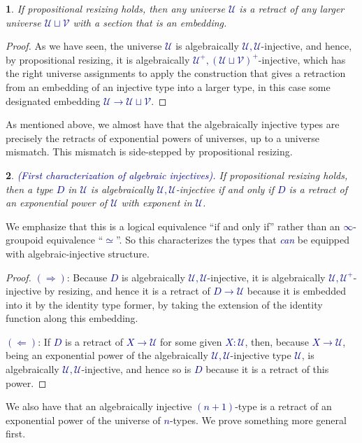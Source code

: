 \documentclass[10pt]{article}
\newcommand{\db}{\textcolor{darkblue}}
\newcommand{\df}[1]{\emph{\db{#1}}}
\newcommand{\m}[1]{\db{$#1$}}
\newcommand{\U}{\mathcal{U}}
\newcommand{\V}{\mathcal{V}}
\newtheorem{numbered}{}
\theoremstyle{definition}
\begin{document}
\begin{numbered}
  If propositional resizing holds, then any universe \m{\U} is a
  retract of any larger universe \m{\U \sqcup \V} with a section that
  is an embedding.
\end{numbered}
\begin{proof}
  As we have seen, the universe \m{\U} is algebraically
  \m{\U,\U}-injective, and hence, by propositional resizing, it is
  algebraically \m{\U^+,(\U \sqcup \V)^+}-injective, which has the
  right universe assignments to apply the construction that gives a
  retraction from an embedding of an injective type into a larger
  type, in this case some designated embedding \m{\U \to \U \sqcup
    \V}.
\end{proof}

As mentioned above, we almost have that the algebraically injective
types are precisely the retracts of exponential powers of universes,
up to a universe mismatch. This mismatch is side-stepped by
propositional resizing.

\begin{numbered} \df{(First characterization of algebraic injectives).}
  If propositional resizing holds, then a type \m{D} in \m{\U} is
  algebraically \m{\U,\U}-injective if and only if \m{D} is a retract
  of an exponential power of \m{\U} with exponent in \m{\U}.
\end{numbered}
\noindent We emphasize that this is a logical equivalence ``if and
only if'' rather than an \m{\infty}-groupoid equivalence
``\m{\simeq}''.  So this characterizes the types
  that \df{can} be equipped with algebraic-injective structure.
\begin{proof}
  \m{(\Rightarrow)}: Because \m{D} is algebraically
  \m{\U,\U}-injective, it is algebraically \m{\U,\U^+}-injective by
  resizing, and hence it is a retract of \m{D \to \U} because it is
  embedded into it by the identity type former, by taking the
  extension of the identity function along this embedding.

  \m{(\Leftarrow)}: If \m{D} is a retract of \m{X \to \U} for some
  given \m{X:\U}, then, because \m{X \to \U}, being an exponential
  power of the algebraically \m{\U ,\U}-injective type \m{\U}, is
  algebraically \m{\U,\U}-injective, and hence so is \m{D} because it
  is a retract of this power.
\end{proof}

We also have that an algebraically injective \m{(n+1)}-type is a retract
of an exponential power of the universe of \m{n}-types. We prove something
more general first.
\end{document}
